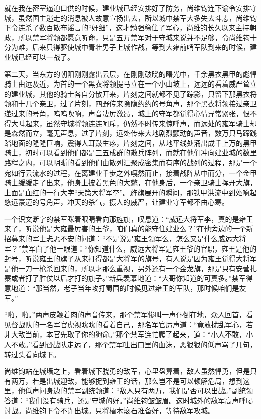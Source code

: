 就在我在密室逼迫口供的时候，建业城已经安排好了防务，尚维钧连下谕令安排守城，虽然国主逃走的消息被人故意宣扬出去，所以城中禁军大多失去斗志，尚维钧下令连杀了数百散布谣言的“奸细”，这才勉强稳住了军心，尚维钧长久以来主持朝政，所以禁军将领都愿意听命，只是五万禁军对于守城来说并不足够，令尚维钧十分为难，后来只得驱使城中青壮男子上城作战，等到大雍前哨军队到来的时候，建业城已经可以一战了。

第二天，当东方的朝阳刚刚露出云层，在刚刚破晓的曙光中，千余黑衣黑甲的彪悍骑士由远及近，为首的一个黑衣将领提马立在一个小山坡上，远远的看着威严耸立的建业城，其他的骑士各自分散开来，片刻之间就都不见了踪影，只留下那黑衣将领和十几个亲卫，过了片刻，四野传来隐隐约约的号角声，那个黑衣将领接过亲卫递过来的号角，呜呜吹响，声音凄厉激昂，城上的守军都觉得心情异常紧张，恨不得大叫起来，虽然守城将领连连呵斥，仍然不时传来惊呼声，而远处的雍军骑士却是森然而立，毫无声息，过了片刻，远处传来大地剧烈颤动的声音，数万只马蹄践踏地面的隆隆巨响，震得人耳鼓生疼，片刻之间，从地平线处涌出成千上万的黑甲骑士，初时可以看到他们都是三五成群的散兵阵列，而就在他们冲向建业城的数里路程之内，可以明晰的看到他们由散列汇聚成密集而有序的战列的过程，那是一个宛如行云流水的过程，在离建业千步之外嘎然而止，接着战阵从中而分，一个金甲骑士缓缓走了出来，他身上披着黑色的大氅，在他身后，一个亲卫骑士挥开大旗，上面是血红的一行大字“天策大将军李”。旌旗展开的瞬间，那铁甲洪流中到处响起悠远豪迈的号角声，冲天的杀气，摄人的威严，让建业守军都不由心寒。

一个识文断字的禁军眯着眼睛看向那旌旗，叹息道：“威远大将军李，真的是雍王来了，听说他是大雍最厉害的王爷，咱们真的能守住建业么？”在他旁边的一个新招募来的军士忐忑不安的问道：“不是说是雍王领军么，怎么又是什么威远大将军？”禁军白了他一眼道：“你知道什么，威远大将军是雍王爷的官职，雍王是他的封号，听说雍王的旗子从来打得都是大将军的旗号，有人说是因为雍王觉得大将军是他一刀一枪杀回来的，所以才那么重视，另外还有一个金龙旗，那是只有安营扎寨或者打了胜仗以后才打的旗子。”新兵羡慕地道：“大哥你知道的可真多。”禁军得意地道：“那当然，老子当年攻打蜀国的时候见过雍王的军队，那时候咱们是友军。”

“啪，啪。”两声皮鞭着肉的声音传来，那个禁军惨叫一声仆倒在地，众人回首，看见督战队的一名军官虎视眈眈的看着自己，那名军官厉声道：“竟敢扰乱军心，若非大敌当前，本官先取了你的狗命。”那个禁军连忙爬了起来，道：“小人不敢，小人不敢。”看到督战队走远了，那个禁军吐出口里的血沫，恶狠狠的低声骂了几句，转过头看向城下。

尚维钧站在城墙之上，看着城下骁勇的敌军，心里盘算着，敌人虽然悍勇，但是只有两万，若是出城迎敌，能够捉到雍王的话，那么岂不是可以顿解危局，想到这里，他低声问身边的禁军副统领道：“敌人只有两万，我们是否可以出战。”副统领答道：“我们没有骑兵，还是守城的好。”尚维钧皱皱眉。这时城外的敌军高声呼喝讨战。尚维钧下令不许出城。只将檑木滚石准备好，等待敌军攻城。

